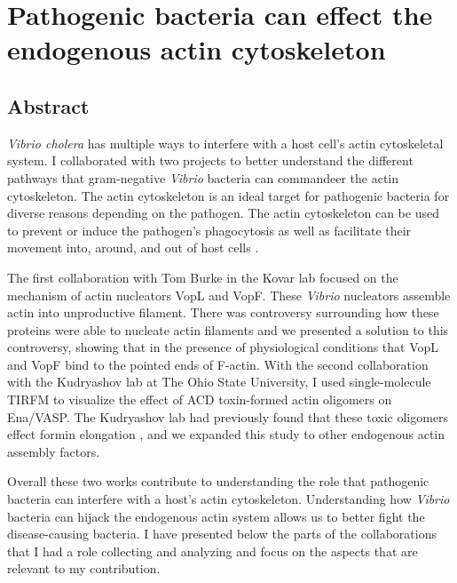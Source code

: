 \chapter{Pathogenic bacteria can effect the endogenous actin cytoskeleton}\label{ch:vibrio}

\section[Abstract]{Abstract\footnotemark}
\textit{Vibrio cholera} has multiple ways to interfere with a host cell’s actin cytoskeletal system. I collaborated with two projects to better understand the different pathways that gram-negative \textit{Vibrio} bacteria can commandeer the actin cytoskeleton. The actin cytoskeleton is an ideal target for pathogenic bacteria for diverse reasons depending on the pathogen. The actin cytoskeleton can be used to prevent or induce the pathogen's phagocytosis as well as facilitate their movement into, around, and out of host cells \citep{liverman_arp2/3-independent_2007}. 

The first collaboration with Tom Burke in the Kovar lab focused on the mechanism of actin nucleators VopL and VopF. These \textit{Vibrio} nucleators assemble actin into unproductive filament. There was controversy surrounding how these proteins were able to nucleate actin filaments and we presented a solution to this controversy, showing that in the presence of physiological conditions that VopL and VopF bind to the pointed ends of F-actin. With the second collaboration with the Kudryashov lab at The Ohio State University, I used single-molecule TIRFM to visualize the effect of ACD toxin-formed actin oligomers on Ena/VASP. The Kudryashov lab had previously found that these toxic oligomers effect formin elongation \citep{heisler_acd_2015}, and we expanded this study to other endogenous actin assembly factors. 

Overall these two works contribute to understanding the role that pathogenic bacteria can interfere with a host's actin cytoskeleton. Understanding how \textit{Vibrio} bacteria can hijack the endogenous actin system allows us to better fight the disease-causing bacteria. I have presented below the parts of the collaborations that I had a role collecting and analyzing and focus on the aspects that are relevant to my contribution. 


